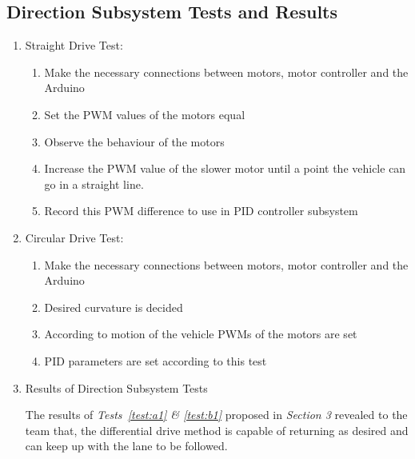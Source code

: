 \documentclass[a4paper,12pt]{article}
\begin{document}


\subsection {Direction Subsystem Tests and Results}

\begin{enumerate}


\item Straight Drive Test: \label{test:a1}	


\begin{enumerate}

\item Make the necessary connections between motors, motor controller and the Arduino  

\item Set the PWM values of the motors equal  

\item Observe the behaviour of the motors  

\item Increase the PWM value of the slower motor until a point the vehicle can go in a straight line.

\item Record this PWM difference to use in PID controller subsystem

\end{enumerate}




\item Circular Drive Test: \label{test:b1}	

\begin{enumerate}

\item Make the necessary connections between motors, motor controller and the Arduino  

\item Desired curvature is decided  

\item  According to motion of the vehicle PWMs of the motors are set  

\item  PID parameters are set according to this test

\end{enumerate}


\item{Results of Direction Subsystem Tests}


The results of \textit{Tests~\ref{test:a1} \& \ref{test:b1}} proposed in \textit{Section 3} revealed to the team that, the differential drive method is capable of returning as desired and can keep up with the lane to be followed.
\end{enumerate}
\end{document}
